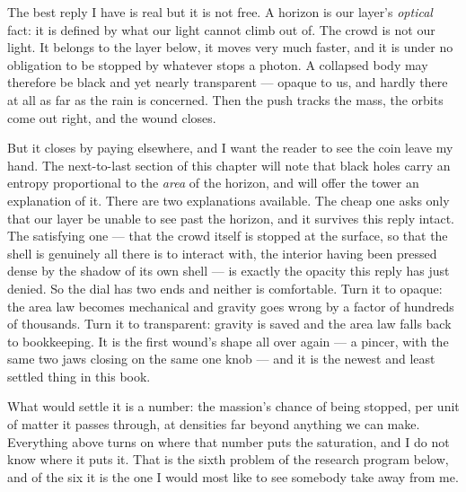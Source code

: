The best reply I have is real but it is not free. A horizon is our layer's \emph{optical} fact: it is defined by what our light cannot climb out of. The crowd is not our light. It belongs to the layer below, it moves very much faster, and it is under no obligation to be stopped by whatever stops a photon. A collapsed body may therefore be black and yet nearly transparent --- opaque to us, and hardly there at all as far as the rain is concerned. Then the push tracks the mass, the orbits come out right, and the wound closes.

But it closes by paying elsewhere, and I want the reader to see the coin leave my hand. The next-to-last section of this chapter will note that black holes carry an entropy proportional to the \emph{area} of the horizon, and will offer the tower an explanation of it. There are two explanations available. The cheap one asks only that our layer be unable to see past the horizon, and it survives this reply intact. The satisfying one --- that the crowd itself is stopped at the surface, so that the shell is genuinely all there is to interact with, the interior having been pressed dense by the shadow of its own shell --- is exactly the opacity this reply has just denied. So the dial has two ends and neither is comfortable. Turn it to opaque: the area law becomes mechanical and gravity goes wrong by a factor of hundreds of thousands. Turn it to transparent: gravity is saved and the area law falls back to bookkeeping. It is the first wound's shape all over again --- a pincer, with the same two jaws closing on the same one knob --- and it is the newest and least settled thing in this book.

What would settle it is a number: the massion's chance of being stopped, per unit of matter it passes through, at densities far beyond anything we can make. Everything above turns on where that number puts the saturation, and I do not know where it puts it. That is the sixth problem of the research program below, and of the six it is the one I would most like to see somebody take away from me.

